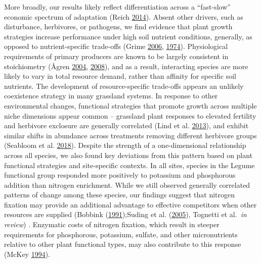 \documentclass[twoside,12pt,final]{ucthesis-CA2012}
\begin{document}
\begin{ucmainmatter}
More broadly, our results likely reflect differentiation across a ``fast-slow'' economic spectrum of adaptation (Reich \protect\hyperlink{ref-Reich2014}{2014}). Absent other drivers, such as disturbance, herbivores, or pathogens, we find evidence that plant growth strategies increase performance under high soil nutrient conditions, generally, as opposed to nutrient-specific trade-offs (Grime \protect\hyperlink{ref-Grime2006}{2006}, \protect\hyperlink{ref-Grime1974}{1974}). Physiological requirements of primary producers are known to be largely consistent in stoichiometry (Ågren \protect\hyperlink{ref-Agren2004}{2004}, \protect\hyperlink{ref-Agren2008}{2008}), and as a result, interacting species are more likely to vary in total resource demand, rather than affinity for specific soil nutrients. The development of resource-specific trade-offs appears an unlikely coexistence strategy in many grassland systems. In response to other environmental changes, functional strategies that promote growth across multiple niche dimensions appear common -- grassland plant responses to elevated fertility and herbivore exclosure are generally correlated (Lind et al. \protect\hyperlink{ref-Lind2013}{2013}), and exhibit similar shifts in abundance across treatments removing different herbivore groups (Seabloom et al. \protect\hyperlink{ref-Seabloom2018}{2018}).
Despite the strength of a one-dimensional relationship across all species, we also found key deviations from this pattern based on plant functional strategies and site-specific contexts. In all sites, species in the Legume functional group responded more positively to potassium and phosphorous addition than nitrogen enrichment. While we still observed generally correlated patterns of change among these species, our findings suggest that nitrogen fixation may provide an additional advantage to effective competitors when other resources are supplied (Bobbink (\protect\hyperlink{ref-Bobbink1991}{1991});Suding et al. (\protect\hyperlink{ref-Suding2005}{2005}), Tognetti et al.~\emph{in review}) . Enzymatic costs of nitrogen fixation, which result in steeper requirements for phosphorous, potassium, sulfate, and other micronutrients relative to other plant functional types, may also contribute to this response (McKey \protect\hyperlink{ref-McKey1994}{1994}).

\end{ucmainmatter}
\end{document}

